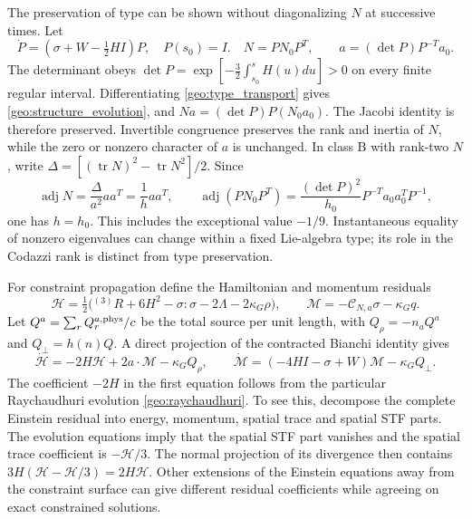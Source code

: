 The preservation of type can be shown without diagonalizing $N$ at successive times. Let
\begin{equation}
 \dot P=(\sigma+W-\tfrac12HI)P,\quad P(s_0)=I.
 \quad
 N=PN_0P^T,\qquad a=(\det P)P^{-T}a_0.
 \label{geo:type_transport}
\end{equation}
The determinant obeys
$\det P=\exp[-\tfrac32\int_{s_0}^sH(u)du]>0$ on every finite regular interval. Differentiating \eqref{geo:type_transport} gives \eqref{geo:structure_evolution}, and
$Na=(\det P)P(N_0a_0)$. The Jacobi identity is therefore preserved. Invertible congruence preserves the rank and inertia of $N$, while the zero or nonzero character of $a$ is unchanged. In class B with rank-two $N$, write
$\Delta=[(\operatorname{tr}N)^2-\operatorname{tr}N^2]/2$. Since
\begin{equation}
 \operatorname{adj}N=\frac{\Delta}{a^2}aa^T=\frac1h aa^T,
 \qquad
 \operatorname{adj}(PN_0P^T)
   =\frac{(\det P)^2}{h_0}P^{-T}a_0a_0^TP^{-1},
 \label{geo:h_invariant}
\end{equation}
one has $h=h_0$. This includes the exceptional value $-1/9$. Instantaneous equality of nonzero eigenvalues can change within a fixed Lie-algebra type; its role in the Codazzi rank is distinct from type preservation.

For constraint propagation define the Hamiltonian and momentum residuals
\begin{equation}
 \mathscr H=\tfrac12\big({}^{(3)}R+6H^2-\sigma:\sigma
                         -2\Lambda-2\kappa_G\rho\big),\qquad
 \mathscr M=-\mathcal C_{N,a}\sigma-\kappa_Gq.
 \label{geo:residuals}
\end{equation}
Let $Q^a=\sum_rQ_r^{a,\rm phys}/c$ be the total source per unit length, with $Q_\rho=-n_aQ^a$ and $Q_\perp=h(n)Q$. A direct projection of the contracted Bianchi identity gives
\begin{equation}
 \dot{\mathscr H}=-2H\mathscr H+2a\cdot\mathscr M-\kappa_GQ_\rho,
 \qquad
 \dot{\mathscr M}=(-4HI-\sigma+W)\mathscr M-\kappa_GQ_\perp.
 \label{geo:constraint_propagation}
\end{equation}
The coefficient $-2H$ in the first equation follows from the particular Raychaudhuri evolution \eqref{geo:raychaudhuri}. To see this, decompose the complete Einstein residual into energy, momentum, spatial trace and spatial STF parts. The evolution equations imply that the spatial STF part vanishes and the spatial trace coefficient is $-\mathscr H/3$. The normal projection of its divergence then contains $3H(\mathscr H-\mathscr H/3)=2H\mathscr H$. Other extensions of the Einstein equations away from the constraint surface can give different residual coefficients while agreeing on exact constrained solutions.

